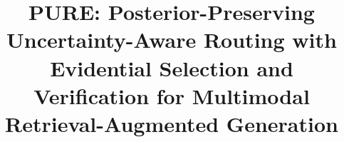 \documentclass[a4paper,fleqn]{cas-dc}
\begin{document}
\let\WriteBookmarks\relax
\def\floatpagepagefraction{1}
\def\textpagefraction{.001}

\shorttitle{}    

\shortauthors{}  

\title [mode = title]{PURE: Posterior-Preserving Uncertainty-Aware Routing with Evidential Selection and Verification for Multimodal Retrieval-Augmented Generation}  

\tnotemark[1] 

\tnotetext[1]{} 

%

\author[1]{}%

\cormark[1]

\fnmark[1]

\ead{}

\ead[url]{}

\credit{}


\author[2]{}%

\fnmark[2]

\ead{}

\ead[url]{}

\credit{}


\end{document}
